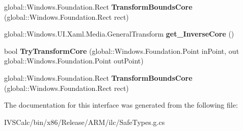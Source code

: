 \begin{DoxyCompactItemize}
\item 
\mbox{\label{interface_windows_1_1_u_i_1_1_xaml_1_1_media_1_1_i_general_transform_overrides_a20e0e564fddb97a43b3c62931dd0dafa}} 
global\+::\+Windows.\+Foundation.\+Rect {\bfseries Transform\+Bounds\+Core} (global\+::\+Windows.\+Foundation.\+Rect rect)
\item 
\mbox{\label{interface_windows_1_1_u_i_1_1_xaml_1_1_media_1_1_i_general_transform_overrides_a7ee385c00a216b72154039895b723310}} 
global\+::\+Windows.\+U\+I.\+Xaml.\+Media.\+General\+Transform {\bfseries get\+\_\+\+Inverse\+Core} ()
\item 
\mbox{\label{interface_windows_1_1_u_i_1_1_xaml_1_1_media_1_1_i_general_transform_overrides_a6af63aa723b299fb2551d307070b5098}} 
bool {\bfseries Try\+Transform\+Core} (global\+::\+Windows.\+Foundation.\+Point in\+Point, out global\+::\+Windows.\+Foundation.\+Point out\+Point)
\item 
\mbox{\label{interface_windows_1_1_u_i_1_1_xaml_1_1_media_1_1_i_general_transform_overrides_a20e0e564fddb97a43b3c62931dd0dafa}} 
global\+::\+Windows.\+Foundation.\+Rect {\bfseries Transform\+Bounds\+Core} (global\+::\+Windows.\+Foundation.\+Rect rect)
\end{DoxyCompactItemize}


The documentation for this interface was generated from the following file\+:\begin{DoxyCompactItemize}
\item 
I\+V\+S\+Calc/bin/x86/\+Release/\+A\+R\+M/ilc/Safe\+Types.\+g.\+cs\end{DoxyCompactItemize}
